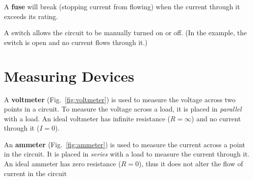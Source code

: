 A \textbf{fuse} will break (stopping current from flowing) when the current
through it exceeds its rating.

\begin{figure}[ht]
  \centering
\end{figure}
A switch allows the circuit to be manually turned on or off. (In the example,
the switch is open and no current flows through it.)



\section{Measuring Devices}

A \textbf{voltmeter} (Fig.~\ref{fig:voltmeter}) is used to measure the voltage
across two points in a circuit. To measure the voltage across a load, it is
placed in \emph{parallel} with a load. %
An ideal voltmeter has infinite resistance ($R=\infty$) and no current through
it ($I=0$).

An \textbf{ammeter} (Fig.~\ref{fig:ammeter}) is used to measure the current
across a point in the circuit. It is placed in \emph{series} with a load to
measure the current through it. An ideal ammeter has zero resistance ($R=0$),
thus it does not alter the flow of current in the circuit

